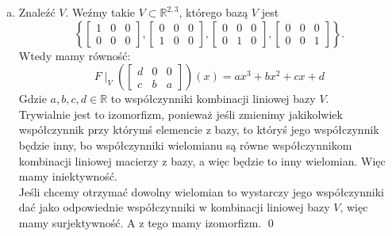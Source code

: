 \documentclass[10pt]{article}
\newcommand{\R}{\mathbb{R}}
\begin{document}
\begin{enumerate}[(a)]
    \newpage
    \item Znaleźć $V$. Weźmy takie $V \subset \R^{2,3}$, którego bazą $V$ jest
    $$\left\{ \begin{bmatrix}
        1 & 0 & 0 \\
        0 & 0 & 0
    \end{bmatrix}, \begin{bmatrix}
        0 & 0 & 0 \\
        1 & 0 & 0
    \end{bmatrix}, \begin{bmatrix}
        0 & 0 & 0 \\
        0 & 1 & 0
    \end{bmatrix}, \begin{bmatrix}
        0 & 0 & 0 \\
        0 & 0 & 1
    \end{bmatrix}\right\}.$$
    Wtedy mamy równość:  
    $$F\mid_V\left(\begin{bmatrix}
    d & 0 & 0 \\
    c & b & a
    \end{bmatrix}\right)(x) = ax^3 + bx^2 + cx + d$$
    Gdzie $a, b, c, d \in \R$ to współczynniki kombinacji liniowej bazy $V$. \\[5pt]
    Trywialnie jest to izomorfizm, ponieważ jeśli zmienimy jakikolwiek współczynnik przy którymś elemencie z bazy, to któryś jego współczynnik będzie inny, bo współczynniki wielomianu są równe współczynnikom kombinacji liniowej macierzy z bazy, a więc będzie to inny wielomian. Więc mamy iniektywność. \\[5pt]
    Jeśli chcemy otrzymać dowolny wielomian to wystarczy jego współczynniki dać jako odpowiednie współczynniki w kombinacji liniowej bazy $V$, więc mamy surjektywność. A z tego mamy izomorfizm. \qed
\end{enumerate}
\end{document}
